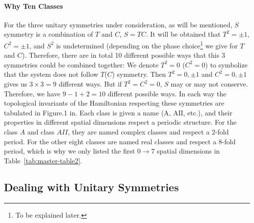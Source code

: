 \documentclass{article}
\begin{document}
\paragraph{Why Ten Classes} For the three unitary symmetries under
consideration, as will be mentioned, $S$ symmetry is a combination of $T$ and
$C$, $S=TC$. It will be obtained that $T^2=\pm 1$, $C^2=\pm 1$, and $S^2$ is
undetermined (depending on the phase choice\footnote{To be explained later.} we
give for $T$ and $C$). Therefore, there are in total 10 different possible ways
that this 3 symmetries could be combined together: We denote $T^2=0$ ($C^2=0$)
to symbolize that the system does not follow $T$($C$) symmetry. Then
$T^2=0,\pm1$ and $C^2=0,\pm1$ gives us $3\times 3=9$ different ways. But if
$T^2=C^2=0$, $S$ may or may not conserve. Therefore, we have $9-1+2=10$
different possible ways. In each way the topological invariants of the
Hamiltonian respecting these symmetries are tabulated in Figure.1
in\cite{Ludwig2015}. Each class is given a name ($\mathrm{A}$, $\mathrm{AII}$,
etc.), and their properties in different spatial dimensions respect a periodic
structure. For the class $A$ and class $AII$, they are named complex classes and
respect a $2$-fold period. For the other eight classes are named real classes
and respect a $8$-fold period, which is why we only listed the first $0\to 7$
spatial dimensions in Table~\ref{tab:master-table2}.

\subsection{Dealing with Unitary Symmetries}
\label{sec:Dealing with Unitary Symmetries}
\end{document}

